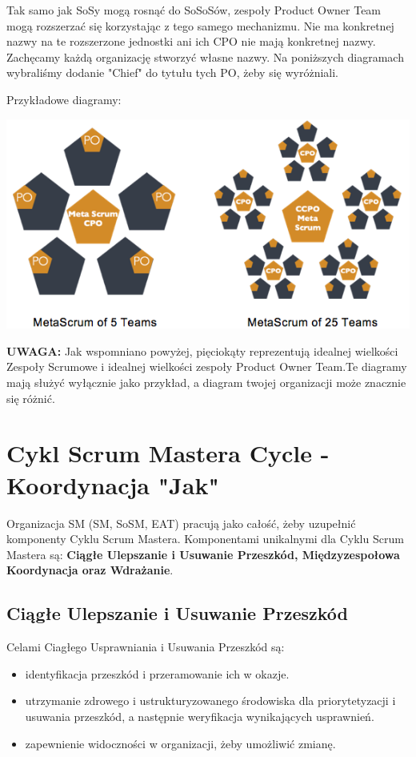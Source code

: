 \documentclass[12pt,a4paper,parskip=full]{scrartcl}
\begin{document}
Tak samo jak SoSy mogą rosnąć do SoSoSów, zespoły Product Owner Team mogą rozszerzać się korzystając z tego samego mechanizmu. Nie ma konkretnej nazwy na te rozszerzone jednostki ani ich CPO nie mają konkretnej nazwy. Zachęcamy każdą organizację stworzyć własne nazwy. Na poniższych diagramach wybraliśmy dodanie "Chief" do tytułu tych PO, żeby się wyróżniali.

Przykładowe diagramy:

\includegraphics[width=1.0\linewidth]{MetaScrum-R2.png}

\textbf{UWAGA:} Jak wspomniano powyżej, pięciokąty reprezentują idealnej wielkości Zespoły Scrumowe i idealnej wielkości zespoły Product Owner Team.Te diagramy mają służyć wyłącznie jako przykład, a diagram twojej organizacji może znacznie się różnić.

\section{Cykl Scrum Mastera Cycle - Koordynacja "Jak"}

Organizacja SM (SM, SoSM, EAT) pracują jako całość, żeby uzupełnić komponenty Cyklu Scrum Mastera. Komponentami unikalnymi dla Cyklu Scrum Mastera są: \textbf{Ciągłe Ulepszanie i Usuwanie Przeszkód, Międzyzespołowa Koordynacja oraz Wdrażanie}.
\subsection{Ciągłe Ulepszanie i Usuwanie Przeszkód}

Celami Ciagłego Usprawniania i Usuwania Przeszkód są:

\begin{itemize}
	\item identyfikacja przeszkód i przeramowanie ich w okazje.
	\item utrzymanie zdrowego i ustrukturyzowanego środowiska dla priorytetyzacji i usuwania przeszkód, a następnie weryfikacja wynikających usprawnień.
	\item zapewnienie widoczności w organizacji, żeby umożliwić zmianę.
\end{itemize}
\end{document}
